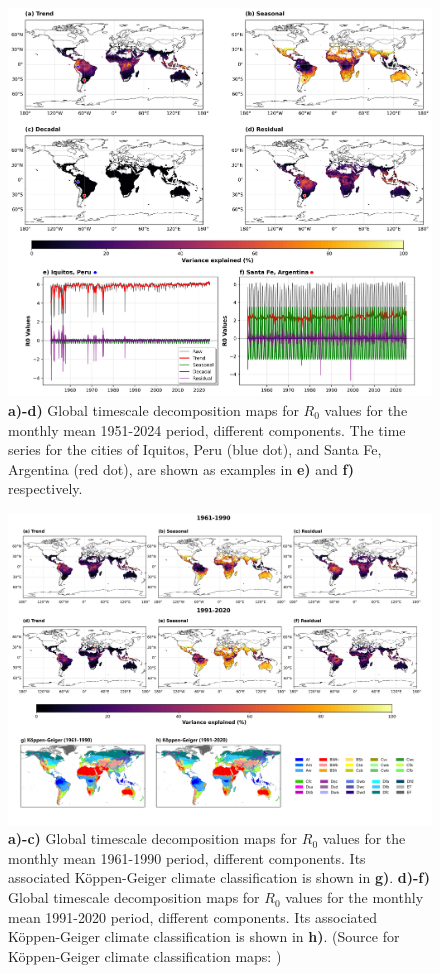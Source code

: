 \documentclass[10pt,twocolumn]{wlscirep}
\begin{document}
\begin{figure}[!ht]
  \centering
  \includegraphics[width=\textwidth]{timescale_decomposition_combined_ps.png}
  \caption{\textbf{a)-d)} Global timescale decomposition maps for $R_0$ values for the monthly mean 1951-2024 period, different components. The time series for the cities of Iquitos, Peru (blue dot), and Santa Fe, Argentina (red dot), are shown as examples in \textbf{e)} and \textbf{f)} respectively.}
  \label{fig:global-timescale-decomposition}
\end{figure}
\begin{figure}[!ht]
  \centering
  \includegraphics[width=\textwidth]{timescale_decomposition_climatology_comparison_ps.png}
  \caption{\textbf{a)-c)} Global timescale decomposition maps for $R_0$ values for the monthly mean 1961-1990 period, different components. Its associated Köppen-Geiger climate classification is shown in \textbf{g)}. \textbf{d)-f)} Global timescale decomposition maps for $R_0$ values for the monthly mean 1991-2020 period, different components. Its associated Köppen-Geiger climate classification is shown in \textbf{h)}. (Source for Köppen-Geiger climate classification maps: \cite{beck_2023})}
  \label{fig:global-timescale-decomposition-2}
\end{figure}
\end{document}
